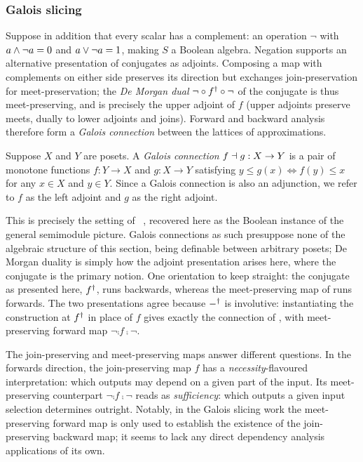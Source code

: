 \subsubsection{Galois slicing}

Suppose in addition that every scalar has a complement: an operation $\neg$ with $a \wedge \neg a =
0$ and $a \vee \neg a = 1$, making $S$ a Boolean algebra. Negation supports an alternative presentation of
conjugates as adjoints. Composing a map with complements on either side preserves its direction but exchanges
join-preservation for meet-preservation; the \emph{De Morgan dual} $\neg \circ f^{\dagger} \circ \neg$ of
the conjugate is thus meet-preserving, and is precisely the upper adjoint of $f$ (upper adjoints
preserve meets, dually to lower adjoints and joins). Forward and backward analysis therefore form a
\emph{Galois connection} between the lattices of approximations.
\begin{definition}
  \label{def:galois-connection}
  Suppose $X$ and $Y$ are posets. A \emph{Galois connection} $f \dashv g: X \to Y$ is a pair of monotone
  functions $f: Y \to X$ and $g: X \to Y$ satisfying $y \leq g(x) \iff f(y) \leq x$ for any $x \in X$ and $y
  \in Y$. Since a Galois connection is also an adjunction, we refer to $f$ as the left adjoint and $g$ as the
  right adjoint.
\end{definition}
This is precisely the setting of \GPS~\cite{perera12a,perera16d,ricciotti17}, recovered here as the
Boolean instance of the general semimodule picture. Galois connections as such presuppose none of the
algebraic structure of this section, being definable between arbitrary posets; De Morgan duality is simply how
the adjoint presentation arises here, where the conjugate is the primary notion. One orientation to keep
straight: the conjugate as presented here, $f^{\dagger}$, runs backwards, whereas the meet-preserving map of \GPS
runs forwards. The two presentations agree because $-^{\dagger}$ is involutive: instantiating the construction at
$f^{\dagger}$ in place of $f$ gives exactly the connection of \GPS, with meet-preserving forward map $\neg \comp
f \comp \neg$.

The join-preserving and meet-preserving maps answer different questions. In the forwards direction, the
join-preserving map $f$ has a \emph{necessity}-flavoured interpretation: which outputs may depend on a given
part of the input. Its meet-preserving counterpart $\neg \comp f \comp \neg$ reads as \emph{sufficiency}:
which outputs a given input selection determines outright. Notably, in the Galois slicing work the
meet-preserving forward map is only used to establish the existence of the join-preserving backward map; it
seems to lack any direct dependency analysis applications of its own.

